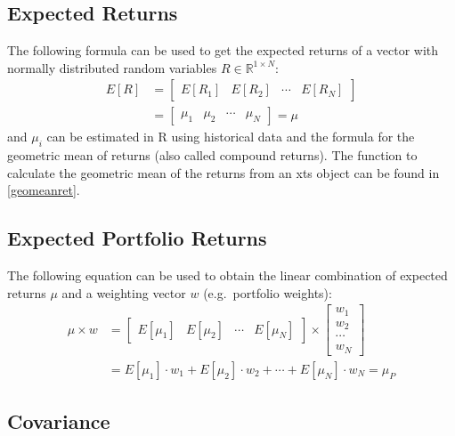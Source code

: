 \documentclass[
  oneside]{book}
\begin{document}
\hypertarget{expected-returns}{%
\subsection{Expected Returns}\label{expected-returns}}

The following formula can be used to get the expected returns of a vector with normally distributed random variables \(R \in \mathbb{R}^{1\times N}\):
\begin{align*}
  E[R] &=
  \begin{bmatrix}
    E[R_{1}] & E[R_{2}] & \cdots & E[R_{N}]  
 \end{bmatrix}\\
 &=
 \begin{bmatrix}
    \mu_{1} & \mu_{2} & \cdots & \mu_{N} 
 \end{bmatrix}
 =
 \mu
\end{align*}
and \(\mu_i\) can be estimated in R using historical data and the formula for the geometric mean of returns (also called compound returns). The function to calculate the geometric mean of the returns from an xts object can be found in \ref{geomeanret}.

\hypertarget{expected-portfolio-returns}{%
\subsection{Expected Portfolio Returns}\label{expected-portfolio-returns}}

The following equation can be used to obtain the linear combination of expected returns \(\mu\) and a weighting vector \(w\) (e.g.~portfolio weights):
\begin{align*}
 \mu \times w &=
  \begin{bmatrix}
    E[\mu_{1}] & E[\mu_{2}] & \cdots & E[\mu_{N}]
 \end{bmatrix}
  \times 
  \begin{bmatrix}
    w_{1} \\ 
    w_{2} \\
    \cdots \\
    w_{N}  
 \end{bmatrix} \\
 &=
 E[\mu_{1}] \cdot w_1 + E[\mu_{2}] \cdot w_2 + \cdots + E[\mu_{N}] \cdot w_{N} 
 =
 \mu_P
\end{align*}

\hypertarget{covariance}{%
\subsection{Covariance}\label{covariance}}
\end{document}
